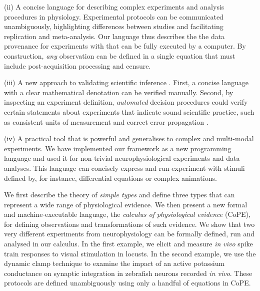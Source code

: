 (ii) A concise language for describing complex experiments and
analysis procedures in physiology. Experimental protocols can be
communicated unambiguously, highlighting differences between studies
and facilitating replication and meta-analysis. Our language thus
describes the the data provenance
\cite{Pool2002,MacKenzie-Graham2008, VanHorn2009} for experiments
with that can be fully executed by a computer. By construction,
\emph{any} observation can be defined in a single equation that must
include post-acquisition processing and censure.

(iii) A new approach to validating scientific inference
\cite{Editors2003, Editors2010}. First, a concise language with a
clear mathematical denotation can be verified manually. Second, by
inspecting an experiment definition, \emph{automated} decision procedures
could verify certain statements about experiments that indicate sound
scientific practice, such as consistent units of measurement
\cite{Kennedy1997} and correct error propagation \cite{Taylor1997}.

(iv) A practical tool that is powerful and generalises to complex and
multi-modal experiments. We have implemented our framework as a new
programming language and used it for non-trivial neurophysiological
experiments and data analyses. This language can concisely express and
run experiment with stimuli defined by, for instance, differential
equations or complex animations.

We first describe the theory of \emph{simple types}
\cite{Pierce2002, Hindley2008} and define three types that can represent a wide
range of physiological evidence. We then present a new formal and
machine-executable language, the \emph{calculus of physiological
  evidence} (CoPE), for defining observations and transformations of
such evidence. We show that two very different experiments from
neurophysiology can be formally defined, run and analysed in our
calculus. In the first example, we elicit and measure \emph{in vivo}
spike train responses to visual stimulation in locusts. In the second
example, we use the dynamic clamp technique to examine the impact of
an active potassium conductance on synaptic integration in zebrafish
neurons recorded \emph{in vivo}. These protocols are defined
unambiguously using only a handful of equations in CoPE.

